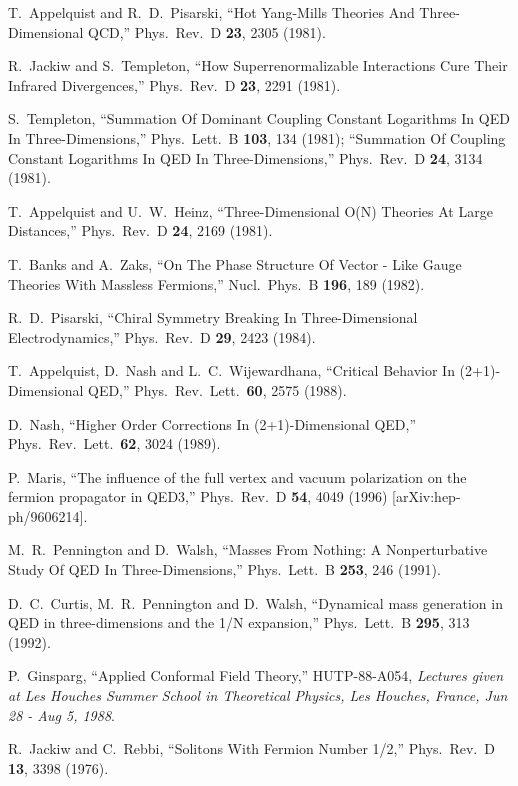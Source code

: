\documentclass[a4paper,12pt, amsfonts, amssymb]{article}
\begin{document}
\begin{thebibliography}{99}
T.~Appelquist and R.~D.~Pisarski, ``Hot Yang-Mills Theories And Three-Dimensional QCD,'' Phys.\ Rev.\ D {\bf 23}, 2305 (1981).

R.~Jackiw and S.~Templeton,
``How Superrenormalizable Interactions Cure Their Infrared Divergences,''
Phys.\ Rev.\ D {\bf 23}, 2291 (1981).

S.~Templeton,
``Summation Of Dominant Coupling Constant Logarithms In QED In Three-Dimensions,'' Phys.\ Lett.\ B {\bf 103}, 134 (1981);
``Summation Of Coupling Constant Logarithms In QED In Three-Dimensions,''
Phys.\ Rev.\ D {\bf 24}, 3134 (1981).

T.~Appelquist and U.~W.~Heinz,
``Three-Dimensional O(N) Theories At Large Distances,''
Phys.\ Rev.\ D {\bf 24}, 2169 (1981).


T.~Banks and A.~Zaks,
``On The Phase Structure Of Vector - Like Gauge Theories With Massless Fermions,'' Nucl.\ Phys.\ B {\bf 196}, 189 (1982).

R.~D.~Pisarski, ``Chiral Symmetry Breaking In Three-Dimensional Electrodynamics,'' Phys.\ Rev.\ D {\bf 29}, 2423 (1984).

T.~Appelquist, D.~Nash and L.~C.~Wijewardhana,
``Critical Behavior In (2+1)-Dimensional QED,''
Phys.\ Rev.\ Lett.\  {\bf 60}, 2575 (1988).

D.~Nash, ``Higher Order Corrections In (2+1)-Dimensional QED,''
Phys.\ Rev.\ Lett.\  {\bf 62}, 3024 (1989).

P.~Maris, ``The influence of the full vertex and vacuum polarization on the fermion  propagator in QED3,''
Phys.\ Rev.\ D {\bf 54}, 4049 (1996)
[arXiv:hep-ph/9606214].

M.~R.~Pennington and D.~Walsh, ``Masses From Nothing: A Nonperturbative Study Of QED In Three-Dimensions,'' Phys.\ Lett.\ B {\bf 253}, 246 (1991).

D.~C.~Curtis, M.~R.~Pennington and D.~Walsh,
``Dynamical mass generation in QED in three-dimensions and the 1/N expansion,'' Phys.\ Lett.\ B {\bf 295}, 313 (1992).

P.~Ginsparg,
``Applied Conformal Field Theory,'' HUTP-88-A054,
{\it Lectures given at Les Houches Summer School in Theoretical Physics, Les Houches, France, Jun 28 - Aug 5, 1988}.

R.~Jackiw and C.~Rebbi, ``Solitons With Fermion Number 1/2,''
Phys.\ Rev.\ D {\bf 13}, 3398 (1976).


\end{thebibliography}
\end{document}
